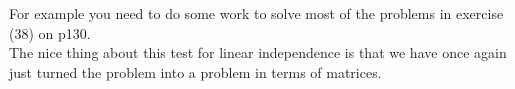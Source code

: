 \documentclass[12pt]{article}
\begin{document}
For example you need to do some work to solve most of the problems in exercise (38) on p130.\\

The nice thing about this test for linear independence is that we have once again just turned the problem into a problem in terms of matrices.













\end{document}
